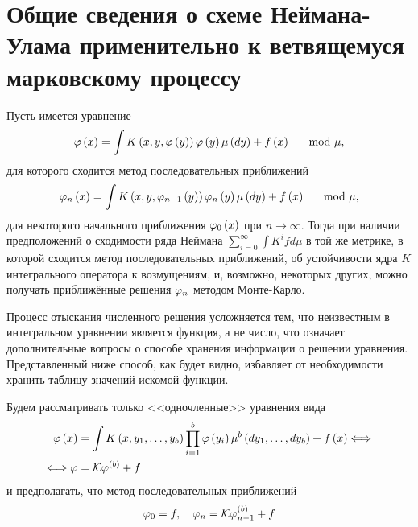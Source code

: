 \section{Общие сведения о схеме Неймана-Улама применительно к ветвящемуся марковскому процессу}\label{sec:neyman-ulam}
Пусть имеется уравнение 
\begin{equation}
	\varphi\left(x\right) = \int K\left(x, y, \varphi\left(y\right)\right)\varphi\left(y\right) \mu\left(dy\right) + f\left(x\right) \quad \mod \mu,
\end{equation}
для которого сходится метод последовательных приближений
\begin{equation}
	\varphi_n\left(x\right) = \int K\left(x, y, \varphi_{n-1}\left(y\right)\right)\varphi_n\left(y\right) \mu\left(dy\right) + f\left(x\right) \quad \mod \mu,
\end{equation}
для некоторого начального приближения $\varphi_0\left(x\right)$ при $n\to\infty$. Тогда при наличии предположений о сходимости ряда Неймана $\sum_{i=0}^\infty \int K^i f d\mu$ в той же метрике, в которой сходится метод последовательных приближений, об устойчивости ядра $K$ интегрального оператора к возмущениям, и, возможно, некоторых других, можно получать приближённые решения $\varphi_n$ методом Монте-Карло.

Процесс отыскания численного решения усложняется тем, что неизвестным в интегральном уравнении является функция, а не число, что означает дополнительные вопросы о способе хранения информации о решении уравнения. Представленный ниже способ, как будет видно, избавляет от необходимости хранить таблицу значений искомой функции.

Будем рассматривать только <<одночленные>> уравнения вида 
\begin{align}
	\varphi\left(x\right) &= \int K\left(x, y_1, \ldots,y_b\right)\prod_{i=1}^b\varphi\left(y_i\right)\mu^b\left(dy_1, \ldots,dy_b\right) + f\left(x\right) \Longleftrightarrow \label{eq:tree-basic}\\
	\Longleftrightarrow \varphi &= \mathcal{K}\varphi^{\left(b\right)} + f \nonumber
\end{align}
и предполагать, что метод последовательных приближений 
\begin{equation}
\label{eq:consecutive-approximations}
\varphi_0 = f, \quad\varphi_n = \mathcal{K}\varphi_{n-1}^{(b)} + f
\end{equation}

